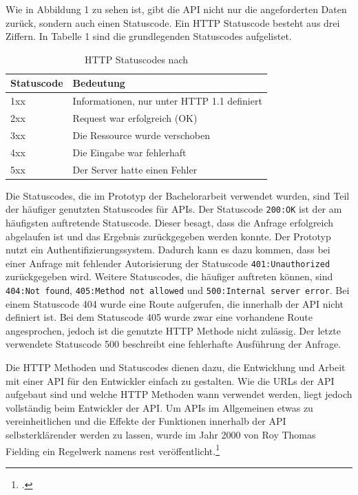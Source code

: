 Wie in Abbildung 1 zu sehen ist, gibt die API nicht nur die angeforderten Daten zurück, sondern auch einen Statuscode. Ein HTTP Statuscode besteht aus drei Ziffern. In Tabelle 1 sind die grundlegenden Statuscodes aufgelistet.

\begin{table}[H]
\centering
\begin{tabular}{l|l}
\textbf{Statuscode} & \textbf{Bedeutung} \\
\hline
1xx & Informationen, nur unter HTTP 1.1 definiert \\
2xx & Request war erfolgreich (OK) \\
3xx & Die Ressource wurde verschoben \\
4xx & Die Eingabe war fehlerhaft \\
5xx & Der Server hatte einen Fehler \\
\end{tabular}
\caption{HTTP Statuscodes nach \cite{doglio2015pro}}
\end{table}

Die Statuscodes, die im Prototyp der Bachelorarbeit verwendet wurden, sind Teil der häufiger genutzten Statuscodes für APIs. Der Statuscode \texttt{200:OK} ist der am häufigsten auftretende Statuscode. Dieser besagt, dass die Anfrage erfolgreich abgelaufen ist und das Ergebnis zurückgegeben werden konnte. Der Prototyp nutzt ein Authentifizierungssystem. Dadurch kann es dazu kommen, dass bei einer Anfrage mit fehlender Autorisierung der Statuscode \texttt{401:Unauthorized} zurückgegeben wird. Weitere Statuscodes, die häufiger auftreten können, sind \texttt{404:Not found}, \texttt{405:Method not allowed} und \texttt{500:Internal server error}. Bei einem Statuscode 404 wurde eine Route aufgerufen, die innerhalb der API nicht definiert ist. Bei dem Statuscode 405 wurde zwar eine vorhandene Route angesprochen, jedoch ist die genutzte HTTP Methode nicht zulässig. Der letzte verwendete Statuscode 500 beschreibt eine fehlerhafte Ausführung der Anfrage. 

Die HTTP Methoden und Statuscodes dienen dazu, die Entwicklung und Arbeit mit einer API für den Entwickler einfach zu gestalten. Wie die URLs der API aufgebaut sind und welche HTTP Methoden wann verwendet werden, liegt jedoch vollständig beim Entwickler der API. Um APIs im Allgemeinen etwas zu vereinheitlichen und die Effekte der Funktionen innerhalb der API selbsterklärender werden zu lassen, wurde im Jahr 2000 von Roy Thomas Fielding ein Regelwerk namens \ac{rest} veröffentlicht.\footcite{masse2011rest}

